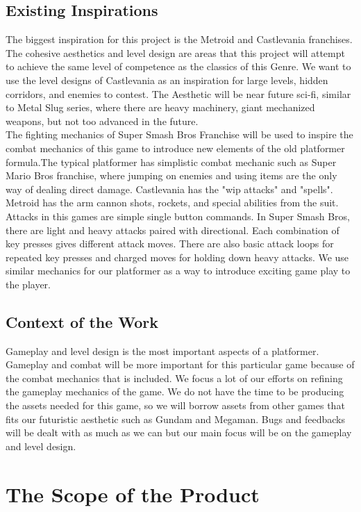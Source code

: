 \documentclass{article}
\begin{document}
	\subsection{Existing Inspirations}
	The biggest inspiration for this project is the Metroid and Castlevania franchises. The cohesive aesthetics and level design are areas that this project will attempt to achieve the same level of competence as the classics of this Genre. We want to use the level designs of Castlevania as an inspiration for large levels, hidden corridors, and enemies to contest. The Aesthetic will be near future sci-fi, similar to Metal Slug series, where there are heavy machinery, giant mechanized weapons, but not too advanced in the future. \\
The fighting mechanics of Super Smash Bros Franchise will be used to inspire the combat mechanics of this game to introduce new elements of the old platformer formula.The typical platformer has simplistic combat mechanic such as Super Mario Bros franchise, where jumping on enemies and using items are the only way of dealing direct damage. Castlevania has the "wip attacks" and "spells". Metroid has the arm cannon shots, rockets, and special abilities from the suit. Attacks in this games are simple single button commands. In Super Smash Bros, there are light and heavy attacks paired with directional. Each combination of key presses gives different attack moves. There are also basic attack loops for repeated key presses and charged moves for holding down heavy attacks. We use similar mechanics for our platformer as a way to introduce exciting game play to the player.
	\subsection{Context of the Work}
	Gameplay and level design is the most important aspects of a platformer. Gameplay and combat will be more important for this particular game because of the combat mechanics that is included. We focus a lot of our efforts on refining the gameplay mechanics of the game. We do not have the time to be producing the assets needed for this game, so we will borrow assets from other games that fits our futuristic aesthetic such as Gundam and Megaman. Bugs and feedbacks will be dealt with as much as we can but our main focus will be on the gameplay and level design.


	\section{The Scope of the Product}
\end{document}
